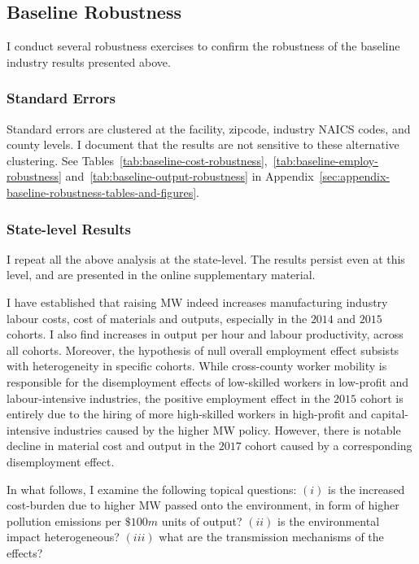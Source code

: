 \documentclass[authoryear, preprint, twocolumn, 1p]{elsarticle}
\begin{document}
    \subsection{Baseline Robustness}\label{subsec:baseline-robustness}
    I conduct several robustness exercises to confirm the robustness of the baseline industry results presented above.

    \subsubsection{Standard Errors} Standard errors are clustered at the facility, zipcode, industry NAICS codes, and county levels. I document that the results are not sensitive to these alternative clustering. See Tables~\ref{tab:baseline-cost-robustness},~\ref{tab:baseline-employ-robustness} and~\ref{tab:baseline-output-robustness} in Appendix~\ref{sec:appendix-baseline-robustness-tables-and-figures}.

    \subsubsection{State-level Results} I repeat all the above analysis at the state-level. The results persist even at this level, and are presented in the online supplementary material.

    I have established that raising MW indeed increases manufacturing industry labour costs, cost of materials and outputs, especially in the $2014$ and $2015$ cohorts. I also find increases in output per hour and labour productivity, across all cohorts. Moreover, the hypothesis of null overall employment effect subsists with heterogeneity in specific cohorts. While cross-county worker mobility is responsible for the disemployment effects of low-skilled workers in low-profit and labour-intensive industries, the positive employment effect in the $2015$ cohort is entirely due to the hiring of more high-skilled workers in high-profit and capital-intensive industries caused by the higher MW policy. However, there is notable decline in material cost and output in the $2017$ cohort caused by a corresponding disemployment effect.

    In what follows, I examine the following topical questions: $(i)$ is the increased cost-burden due to higher MW passed onto the environment, in form of higher pollution emissions per $\$100m$ units of output? $(ii)$ is the environmental impact heterogeneous? $(iii)$ what are the transmission mechanisms of the effects?
\end{document}
